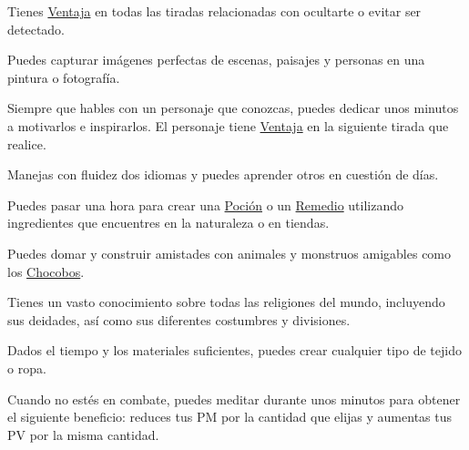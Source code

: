 \begin{description}[leftmargin=*]
{
	Tienes \hyperlink{check}{Ventaja} en todas las tiradas relacionadas con ocultarte o evitar ser detectado.
}

{
	Puedes capturar imágenes perfectas de escenas, paisajes y personas en una pintura o fotografía. 
} 

{
	Siempre que hables con un personaje que conozcas, puedes dedicar unos minutos a motivarlos e inspirarlos. El personaje tiene \hyperlink{check}{Ventaja} en la siguiente tirada que realice.
}

{
	Manejas con fluidez dos idiomas y puedes aprender otros en cuestión de días.
}

{
 Puedes pasar una hora para crear una \hyperlink{item}{Poción} o un \hyperlink{item}{Remedio} utilizando ingredientes que encuentres en la naturaleza o en tiendas.
}

{
 Puedes domar y construir amistades con animales y monstruos amigables como los \hyperlink{chocobo}{Chocobos}.
}

{
 Tienes un vasto conocimiento sobre todas las religiones del mundo, incluyendo sus deidades, así como sus diferentes costumbres y divisiones.
}

{
 Dados el tiempo y los materiales suficientes, puedes crear cualquier tipo de tejido o ropa.
}

{
 Cuando no estés en combate, puedes meditar durante unos minutos para obtener el siguiente beneficio: reduces tus PM por la cantidad que elijas y aumentas tus PV por la misma cantidad.
}

\end{description}

\pagebreak